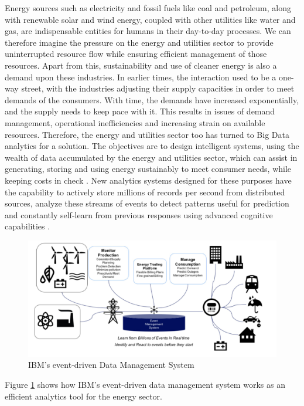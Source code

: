 Energy sources such as electricity and fossil fuels like coal and petroleum, along with renewable solar and wind energy, coupled with other utilities like water and gas, are indispensable entities for humans in their day-to-day processes. We can therefore imagine the pressure on the energy and utilities sector to provide uninterrupted resource flow while ensuring efficient management of those resources. Apart from this, sustainability and use of cleaner energy is also a demand upon these industries. In earlier times, the interaction used to be a one-way street, with the industries adjusting their supply capacities in order to meet demands of the consumers. With time, the demands have increased exponentially, and the supply needs to keep pace with it. This results in issues of demand management, operational inefficiencies and increasing strain on available resources. Therefore, the energy and utilities sector too has turned to Big Data analytics for a solution. The objectives are to design intelligent systems, using the wealth of data accumulated by the energy and utilities sector, which can assist in generating, storing and using energy sustainably to meet consumer needs, while keeping costs in check \cite{downey01}. New analytics systems designed for these purposes have the capability to actively store millions of records per second from  distributed sources, analyze these streams of events to detect patterns useful for prediction and constantly self-learn from previous responses using advanced cognitive capabilities \cite{downey01}.
\begin{figure}
	\includegraphics[width=1.0\columnwidth]{images/IBM_EventStore.jpg}
	\caption{IBM's event-driven Data Management System \cite{downey01}}
	\label{F:event}
\end{figure}
Figure \ref{F:event} shows how IBM's event-driven data management system works as an efficient analytics tool for the energy sector.\\
